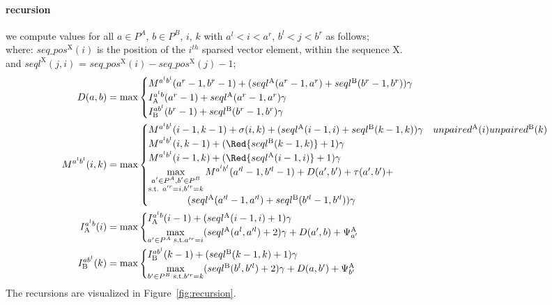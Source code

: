 \documentclass{article}
\newcommand{\DTmat}[2]{D(#1,#2)}
\newcommand{\MTmat}[4]{M^{{#1}^l {#2}^l}(#3,#4)}
\newcommand{\IATmat}[3]{I^{{#1}^l {#2}}_\textrm{A}(#3)}
\newcommand{\IBTmat}[3]{I^{{#1} {#2}^l}_\textrm{B}(#3)}
\newcommand{\numPos}[3]{seql^\textrm{#1}(#3,#2)}
\newcommand{\numPosA}[2]{\numPos{A}{#1}{#2}}
\newcommand{\numPosB}[2]{\numPos{B}{#1}{#2}}
\newcommand{\seqPos}[2]{seq\_pos^\textrm{#1}(#2)}
\newcommand{\unpairedA}[1]{unpaired^\textrm{A}{(#1)}}
\newcommand{\unpairedB}[1]{unpaired^\textrm{B}{(#1)}}
\newcommand{\PsiA}[1]{\Psi^\textrm{A}_{#1}}
\begin{document}
\paragraph{recursion}
we compute values for all $a\in P^A$, $b\in P^B$, $i$, $k$
with $a^l<i<a^r$, $b^l<j<b^r$ as follows;\\ 
where:  $\seqPos{X}{i}$ is the position of the $i^{th}$ sparsed vector element, within the sequence X.\\
and $\numPos{X}{i}{j}$ = $\seqPos{X}{i} - \seqPos{X}{j} -1$;
\begin{align}
  \DTmat{a}{b} &= \max
  \begin{cases}
    \MTmat{a}{b}{a^r-1}{b^r-1} + (\numPosA{a^r}{a^r-1} + \numPosB{b^r}{b^r-1})\gamma\\
    \IATmat{a}{b}{a^r-1} + \numPosA{a^r}{a^r-1}\gamma\\
    \IBTmat{a}{b}{b^r-1} + \numPosB{b^r}{b^r-1}\gamma
  \end{cases}\label{recursionD}\\
  \MTmat{a}{b}{i}{k} &= \max
  \begin{cases}
    \MTmat{a}{b}{i-1}{k-1} + \sigma(i,k) + (\numPosA{i}{i-1} + \numPosB{k}{k-1})\gamma & \unpairedA{i} \unpairedB{k}\\
    \MTmat{a}{b}{i}{k-1} + (\Red{\numPosB{k}{k-1}}+1)\gamma \\
    \MTmat{a}{b}{i-1}{k} + (\Red{\numPosA{i}{i-1}}+1)\gamma     \\
    \max_{\substack{a'\in P^A,b'\in P^B\\\text{s.t. } a'^r=i, b'^r=k}}\limits \MTmat{a}{b}{a'^l-1}{b'^l-1} + \DTmat{a'}{b'} + \tau(a',b') + \\ \qquad\qquad (\numPosA{a'^l}{a'^l-1} + \numPosB{b'^l}{b'^l-1})\gamma
  \end{cases}\label{recursionM}\\
  \IATmat{a}{b}{i} &= \max
  \begin{cases}
    \IATmat{a}{b}{i-1} + (\numPosA{i}{i-1} + 1)\gamma\\
    \max_{a'\in P^A\text{ s.t.} a'^r=i}\limits (\numPosA{a'^l}{a^l}+2)\gamma + \DTmat{a'}{b} +  \PsiA{a'}
  \end{cases}\label{recursionIA}\\
  \IBTmat{a}{b}{k} &= \max
  \begin{cases}
    \IBTmat{a}{b}{k-1} + (\numPosB{k}{k-1} + 1)\gamma\\
    \max_{b'\in P^B\text{ s.t.} b'^r=k}\limits (\numPosB{b'^l}{b^l}+2)\gamma +
    \DTmat{a}{b'} + \PsiA{b'}
  \end{cases}\label{recursionIB}
\end{align}
The recursions are visualized in Figure~\ref{fig:recursion}.
\end{document}
